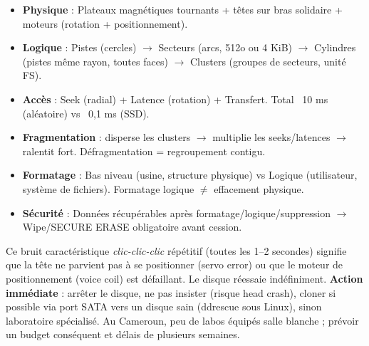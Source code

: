 \documentclass[11pt]{article}
\begin{document}
\begin{aretenir}
\begin{itemize}
    \item \textbf{Physique} : Plateaux magnétiques tournants + têtes sur bras solidaire + moteurs (rotation + positionnement).
    \item \textbf{Logique} : Pistes (cercles) $\rightarrow$ Secteurs (arcs, 512o ou 4 KiB) $\rightarrow$ Cylindres (pistes même rayon, toutes faces) $\rightarrow$ Clusters (groupes de secteurs, unité FS).
    \item \textbf{Accès} : Seek (radial) + Latence (rotation) + Transfert. Total ~10 ms (aléatoire) vs ~0,1 ms (SSD).
    \item \textbf{Fragmentation} : disperse les clusters $\rightarrow$ multiplie les seeks/latences $\rightarrow$ ralentit fort. Défragmentation = regroupement contigu.
    \item \textbf{Formatage} : Bas niveau (usine, structure physique) vs Logique (utilisateur, système de fichiers). Formatage logique $\neq$ effacement physique.
    \item \textbf{Sécurité} : Données récupérables après formatage/logique/suppression $\rightarrow$ Wipe/SECURE ERASE obligatoire avant cession.
\end{itemize}
\end{aretenir}

\begin{savaistu}
Ce bruit caractéristique \emph{clic-clic-clic} répétitif (toutes les 1--2 secondes) signifie que la tête ne parvient pas à se positionner (servo error) ou que le moteur de positionnement (voice coil) est défaillant. Le disque réessaie indéfiniment. \textbf{Action immédiate} : arrêter le disque, ne pas insister (risque head crash), cloner si possible via port SATA vers un disque sain (ddrescue sous Linux), sinon laboratoire spécialisé. Au Cameroun, peu de labos équipés salle blanche ; prévoir un budget conséquent et délais de plusieurs semaines.
\end{savaistu}
\end{document}
